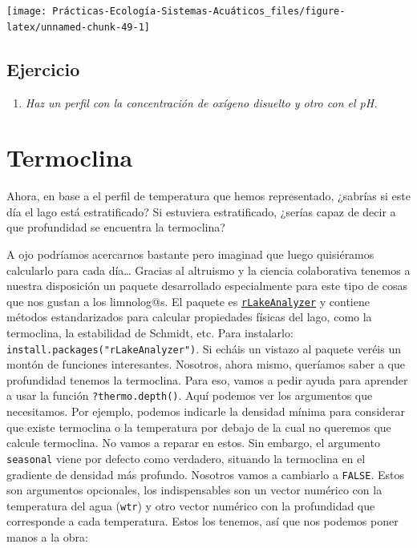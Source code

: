 \documentclass[
]{book}
\newcommand{\passthrough}[1]{#1}
\providecommand{\tightlist}{%
  \setlength{\itemsep}{0pt}\setlength{\parskip}{0pt}}
\begin{document}
\texttt{[image: Prácticas-Ecología-Sistemas-Acuáticos\_files/figure-latex/unnamed-chunk-49-1]}

\hypertarget{ejercicio}{%
\subsection{Ejercicio}\label{ejercicio}}

\begin{enumerate}
\def\labelenumi{\arabic{enumi}.}
\tightlist
\item
  \emph{Haz un perfil con la concentración de oxígeno disuelto y otro con el pH.}
\end{enumerate}

\hypertarget{termoclina}{%
\section{Termoclina}\label{termoclina}}

Ahora, en base a el perfil de temperatura que hemos representado, ¿sabrías si este día el lago está estratificado? Si estuviera estratificado, ¿serías capaz de decir a que profundidad se encuentra la termoclina?

A ojo podríamos acercarnos bastante pero imaginad que luego quisiéramos calcularlo para cada día\ldots{} Gracias al altruismo y la ciencia colaborativa tenemos a nuestra disposición un paquete desarrollado especialmente para este tipo de cosas que nos gustan a los limnolog@s. El paquete es \href{https://cran.r-project.org/web/packages/rLakeAnalyzer/rLakeAnalyzer.pdf}{\passthrough{\lstinline!rLakeAnalyzer!}} y contiene métodos estandarizados para calcular propiedades físicas del lago, como la termoclina, la estabilidad de Schmidt, etc. Para instalarlo: \passthrough{\lstinline!install.packages("rLakeAnalyzer")!}. Si echáis un vistazo al paquete veréis un montón de funciones interesantes. Nosotros, ahora mismo, queríamos saber a que profundidad tenemos la termoclina. Para eso, vamos a pedir ayuda para aprender a usar la función \passthrough{\lstinline!?thermo.depth()!}. Aquí podemos ver los argumentos que necesitamos. Por ejemplo, podemos indicarle la densidad mínima para considerar que existe termoclina o la temperatura por debajo de la cual no queremos que calcule termoclina. No vamos a reparar en estos. Sin embargo, el argumento \passthrough{\lstinline!seasonal!} viene por defecto como verdadero, situando la termoclina en el gradiente de densidad más profundo. Nosotros vamos a cambiarlo a \passthrough{\lstinline!FALSE!}. Estos son argumentos opcionales, los indispensables son un vector numérico con la temperatura del agua (\passthrough{\lstinline!wtr!}) y otro vector numérico con la profundidad que corresponde a cada temperatura. Estos los tenemos, así que nos podemos poner manos a la obra:
\end{document}
